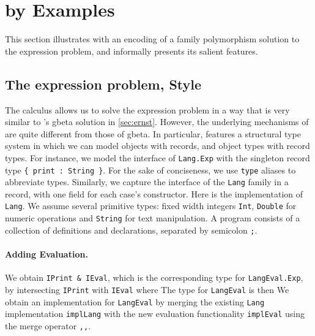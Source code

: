 
\section{\namee by Examples}
\label{nested:sec:overview}

This section illustrates \namee with an encoding of a family polymorphism
solution to the expression problem, and informally presents its salient
features.


\subsection{The expression problem, \namee Style}

The \namee calculus allows us to solve the expression problem in a way that is
very similar to \citeauthor{Ernst_2001}'s \textsf{gbeta} solution in \cref{sec:ernst}.
However, the underlying mechanisms of \namee are quite different from those of
\textsf{gbeta}. In particular, \namee features a structural type system in which we can
model objects with records, and object types with record types. For instance, we
model the interface of \lstinline{Lang.Exp} with the singleton record type
\lstinline${ print : String }$. For the sake of conciseness, we use \lstinline{type} aliases
to abbreviate types.
Similarly, we capture the interface of the \lstinline{Lang} family in a record,
with one field for each case's constructor.
Here is the implementation of \lstinline{Lang}.
We assume several primitive types: fixed width integers \lstinline{Int},
\lstinline{Double} for numeric operations and \lstinline{String} for text
manipulation. A \namee program consists of a collection of definitions and
declarations, separated by semicolon \lstinline{;}.

\paragraph{Adding Evaluation.}
We obtain \lstinline{IPrint & IEval}, which is the corresponding type for \lstinline{LangEval.Exp}, by
intersecting \lstinline{IPrint} with \lstinline{IEval} where
The type for \lstinline{LangEval} is then
We obtain an implementation for \lstinline{LangEval} by merging the existing
\lstinline{Lang} implementation \lstinline{implLang} with the new evaluation
functionality \lstinline{implEval} using the merge operator \lstinline{,,}.

